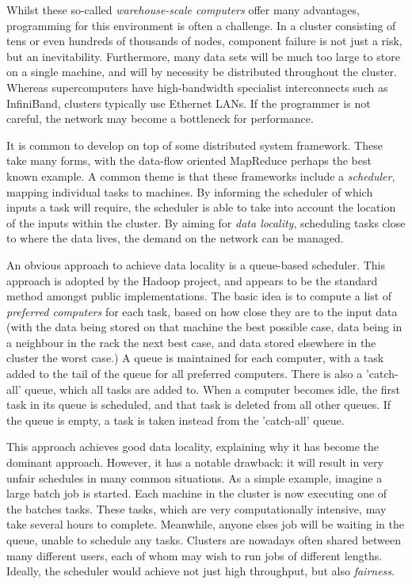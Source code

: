 Whilst these so-called \emph{warehouse-scale computers} offer many advantages, programming for this environment is often a challenge. In a cluster consisting of tens or even hundreds of thousands of nodes, component failure is not just a risk, but an inevitability. Furthermore, many data sets will be much too large to store on a single machine, and will by necessity be distributed throughout the cluster. Whereas supercomputers have high-bandwidth specialist interconnects such as InfiniBand, clusters typically use Ethernet LANs. If the programmer is not careful, the network may become a bottleneck for performance.

It is common to develop on top of some distributed system framework. These take many forms, with the data-flow oriented MapReduce perhaps the best known example. A common theme is that these frameworks include a \emph{scheduler}, mapping individual tasks to machines. By informing the scheduler of which inputs a task will require, the scheduler is able to take into account the location of the inputs within the cluster. By aiming for \emph{data locality}, scheduling tasks close to where the data lives, the demand on the network can be managed.

An obvious approach to achieve data locality is a queue-based scheduler. This approach is adopted by the Hadoop project, and appears to be the standard method amongst public implementations. The basic idea is to compute a list of \emph{preferred computers} for each task, based on how close they are to the input data (with the data being stored on that machine the best possible case, data being in a neighbour in the rack the next best case, and data stored elsewhere in the cluster the worst case.) A queue is maintained for each computer, with a task added to the tail of the queue for all preferred computers. There is also a 'catch-all' queue, which all tasks are added to. When a computer becomes idle, the first task in its queue is scheduled, and that task is deleted from all other queues. If the queue is empty, a task is taken instead from the 'catch-all' queue.

This approach achieves good data locality, explaining why it has become the dominant approach. However, it has a notable drawback: it will result in very unfair schedules in many common situations. As a simple example, imagine a large batch job is started. Each machine in the cluster is now executing one of the batches tasks. These tasks, which are very computationally intensive, may take several hours to complete. Meanwhile, anyone elses job will be waiting in the queue, unable to schedule any tasks. Clusters are nowadays often shared between many different users, each of whom may wish to run jobs of different lengths. Ideally, the scheduler would achieve not just high throughput, but also \emph{fairness}.

